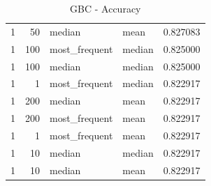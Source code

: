 \documentclass[12pt,twoside]{report}
\begin{document}
\begin{table}[ht!]
\begin{center}
{\begin{tabular}{rrllr}
              1 &                 50 &                          median &                            mean &  0.827083 \\
              1 &                100 &                   most\_frequent &                          median &  0.825000 \\
              1 &                100 &                          median &                          median &  0.825000 \\
              1 &                  1 &                   most\_frequent &                          median &  0.822917 \\
              1 &                200 &                          median &                            mean &  0.822917 \\
              1 &                200 &                   most\_frequent &                            mean &  0.822917 \\
              1 &                  1 &                   most\_frequent &                            mean &  0.822917 \\
              1 &                 10 &                          median &                          median &  0.822917 \\
              1 &                 10 &                          median &                            mean &  0.822917 \\
\bottomrule
\end{tabular}
}
\end{center}
\caption{GBC - Accuracy}
\label{gbc:table}
\end{table}
\end{document}
